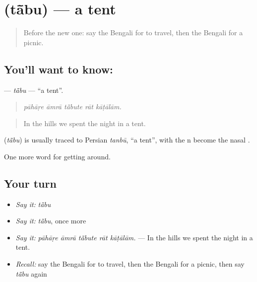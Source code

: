 \section[\texorpdfstring{\bn{তাঁবু} (tā̃bu)}{তাঁবু (tā̃bu)}]{ (tā̃bu) — a tent}

\label{lesson:BN-C399-tabu}



\begin{quote}
Before the new one: say the Bengali for to travel, then the Bengali for a picnic.
\end{quote}

\subsection*{You'll want to know: }
\textbf{} — \emph{tā̃bu} — \textquotedblleft{}a tent\textquotedblright{}.

\begin{quote}
    
\end{quote}

\begin{quote}
\emph{pāhāṛe āmrā tā̃bute rāt kāṭālām.}
\end{quote}

\begin{quote}
In the hills we spent the night in a tent.
\end{quote}

\begin{cousinweb}
\textbf{} (\emph{tā̃bu}) is usually traced to Persian \emph{tanbū}, \textquotedblleft{}a tent\textquotedblright{}, with the n become the nasal .
\end{cousinweb}

\begin{grammarlens}[title={What you've built}]
One more word for getting around.
\end{grammarlens}

\subsection*{Your turn}
\begin{itemize}
\raggedright
  \item \emph{Say it:} \emph{tā̃bu}
  \item \emph{Say it:} \emph{tā̃bu}, once more
  \item \emph{Say it:} \emph{pāhāṛe āmrā tā̃bute rāt kāṭālām.} — In the hills we spent the night in a tent.
  \item \emph{Recall:} say the Bengali for to travel, then the Bengali for a picnic, then say \emph{tā̃bu} again
\end{itemize}

